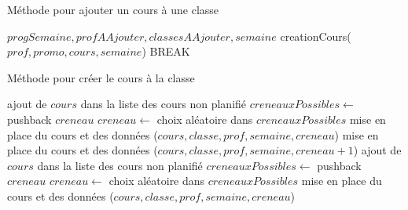 \newpage

\begin{algorithm}
\caption {Méthode pour ajouter un cours à une classe}
\begin{algorithmic}
\REQUIRE $progSemaine, profAAjouter, classesAAjouter, semaine$
\STATE creationCours($prof, promo, cours, semaine$)
\STATE BREAK
\ENDIF
\ENDFOR
\end{algorithmic}
\end{algorithm}

\newpage

\begin{algorithm}
\caption {Méthode pour créer le cours à la classe}
\begin{algorithmic}
	\STATE ajout de $cours$ dans la liste des cours non planifié
			\STATE $creneauxPossibles \leftarrow$ pushback $creneau$
		\ENDIF
	\ENDFOR
		\STATE $creneau \leftarrow$ choix aléatoire dans $creneauxPossibles$
		\STATE mise en place du cours et des données ($cours, classe, prof, semaine, creneau$)
		\STATE mise en place du cours et des données ($cours, classe, prof, semaine, creneau +1$)
	\ENDIF
	\STATE ajout de $cours$ dans la liste des cours non planifié
\ELSE
			\STATE $creneauxPossibles \leftarrow$ pushback $creneau$
		\ENDIF
	\STATE $creneau \leftarrow$ choix aléatoire dans $creneauxPossibles$
	\STATE mise en place du cours et des données ($cours, classe, prof, semaine, creneau$)
	\ENDFOR
\ENDIF
\end{algorithmic}
\end{algorithm}





